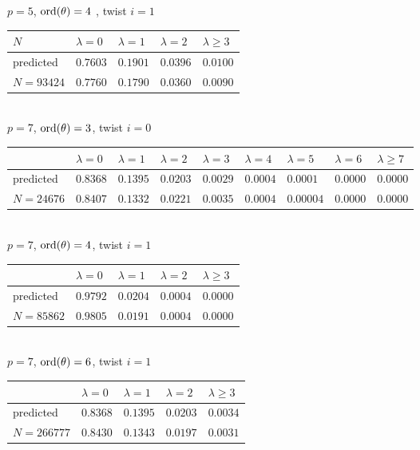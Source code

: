 \documentclass[pdflatex,sn-mathphys-num]{sn-jnl}%
\theoremstyle{plain}
\theoremstyle{definition}
\theoremstyle{remark}
\numberwithin{equation}{section}
\newcommand{\ord}{\text{\rm ord}}
\begin{document}
\noindent $p=5$, $\ord(\theta)=4$ , twist $i=1$\\
\begin{tabular}{|l|l|l|l|l|} \hline
$N$ & $\lambda=0$ & $\lambda=1$ & $\lambda=2$ & $\lambda\geq 3$ \\ \hline
predicted & $0.7603$ & $0.1901$ & $0.0396$ & $0.0100$ \\ \hline
$N=93424$ & $0.7760$ & $0.1790$ & $0.0360$ & $0.0090$ \\ \hline
\end{tabular}\\

\noindent $p=7$, $\ord(\theta)=3$, twist $i=0$\\
\begin{tabular}{|l|l|l|l|l|l|l|l|l|} \hline
& $\lambda=0$ & $\lambda=1$ & $\lambda=2$ & $\lambda=3$ & $\lambda=4$ & $\lambda=5$ & $\lambda=6$ & $\lambda\geq 7$ \\ \hline
predicted & $0.8368$ &  $0.1395$ & $0.0203$ &  $0.0029$ &  $0.0004$ &  $0.0001$ & $0.0000$ & $0.0000$  \\ \hline
$N=24676$ & $0.8407$ & $0.1332$ & $0.0221$ & $0.0035$ & $0.0004$ & $0.00004$ & $0.0000$ & $0.0000$ \\ \hline
\end{tabular}\\


\noindent $p=7$, $\ord(\theta)=4$,   twist $i=1$\\
\begin{tabular}{|l|l|l|l|l|} \hline
& $\lambda=0$ & $\lambda=1$ & $\lambda=2$ & $\lambda\geq 3$ \\ \hline
predicted & $0.9792$ & $0.0204$ & $0.0004$ & $0.0000$ \\ \hline
$N=85862$ & $0.9805$ & $0.0191$ & $0.0004$ & $0.0000$\\ \hline
\end{tabular}\\

\noindent $p=7$, $\ord(\theta)=6$,   twist $i=1$\\
\begin{tabular}{|l|l|l|l|l|} \hline
 & $\lambda=0$ & $\lambda=1$ & $\lambda=2$ & $\lambda\geq 3$ \\ \hline
predicted & $0.8368$ & $0.1395$ & $0.0203$ & $0.0034$  \\ \hline
$N=266777$ & $0.8430$ & $0.1343$ & $0.0197$ & $0.0031$
\\ \hline
\end{tabular}\\
\end{document}

